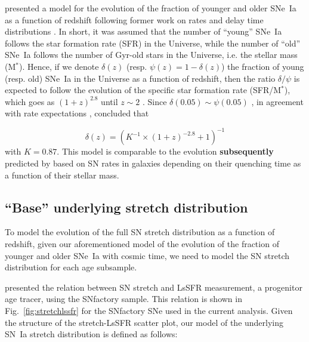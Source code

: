 \documentclass[referee]{aa}
\begin{document}
\cite{rigault2020} presented a model for the evolution of the fraction of
younger and older SNe~Ia as a function of redshift following former work on
rates and delay time distributions \citep[e.g.,][]{mannucci2005,
scannapieco2005, sullivan2006, aubourg2008, childress2014, maozmannucci2014}.
In short, it was assumed that the number of ``young'' SNe~Ia follows the star
formation rate (SFR) in the Universe, while the number of ``old'' SNe~Ia follows
the number of Gyr-old stars in the Universe, i.e. the stellar mass (M$^*$).
Hence, if we denote $\delta(z)$ (resp. $\psi(z) = 1-\delta(z)$) the fraction of
young (resp. old) SNe~Ia in the Universe as a function of redshift, then the
ratio $\delta/\psi$ is expected to follow the evolution of the specific star
formation rate (SFR/M$^*$), which goes as $(1+z)^{2.8}$ until $z\sim2$
\citep[e.g.,][]{tasca2015}. Since $\delta(0.05) \sim \psi(0.05)$
\citep{rigault2013, rigault2020, wiseman2020}, in agreement with rate
expectations \citep{mannucci2006, rodney2014}, \cite{rigault2020} concluded that

\begin{equation}
    \label{eq:delta}
    \delta(z) = \left( K^{-1} \times (1+z)^{-2.8} +1 \right)^{-1}
\end{equation}
with $K=0.87$. This model is comparable to the evolution \textbf{subsequently}
predicted by \cite{childress2014} based on SN rates in galaxies depending on
their quenching time as a function of their stellar mass.

\subsection{``Base'' underlying stretch distribution}
\label{sec:basemodel}

To model the evolution of the full SN stretch distribution as a function of
redshift, given our aforementioned model of the evolution of the fraction of
younger and older SNe~Ia with cosmic time, we need to model the SN stretch
distribution for each age subsample. 

\cite{rigault2020} presented the relation between SN stretch and LsSFR
measurement, a progenitor age tracer, using the SNfactory sample. This relation
is shown in Fig.~\ref{fig:stretchlssfr} for the SNfactory SNe used in the
current analysis. Given the structure of the stretch-LsSFR scatter plot, our
model of the underlying SN~Ia stretch distribution is defined as follows:
\end{document}
